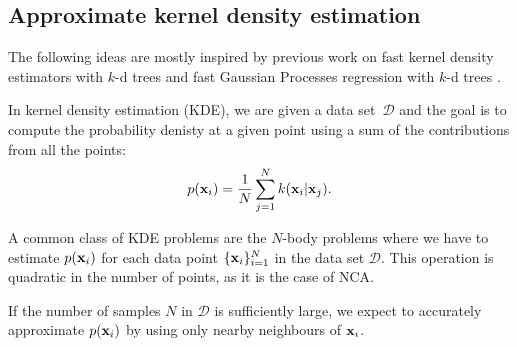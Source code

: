 	
	

\subsection{Approximate kernel density estimation}
\label{subsec:approx-kde}

The following ideas are mostly inspired by previous work on fast kernel density estimators with $k$-d trees \citep{gray2001, gray2003, gray2003b} and fast Gaussian Processes regression with $k$-d trees \citep{shen2006}.

In kernel density estimation (KDE), we are given a data set~$\mathcal{D}$ and the goal is to compute the probability denisty at a given point using a sum of the contributions from all the points:
\begin{align}
p(\mathbf{x}_i) = \frac{1}{N}\sum_{j=1}^Nk(\mathbf{x}_i|\mathbf{x}_j).
\end{align}

A common class of KDE problems are the $N$-body problems \citep{gray2001} where we have to estimate $p(\mathbf{x}_i)$ for each data point $\{\mathbf{x}_i\}_{i=1}^N$ in the data set $\mathcal{D}$. This operation is quadratic in the number of points, as it is the case of NCA\@.

If the number of samples $N$ in $\mathcal{D}$ is sufficiently large, we
expect to accurately approximate $p(\mathbf{x}_i)$ by using only nearby neighbours of $\mathbf{x}_i$. 

